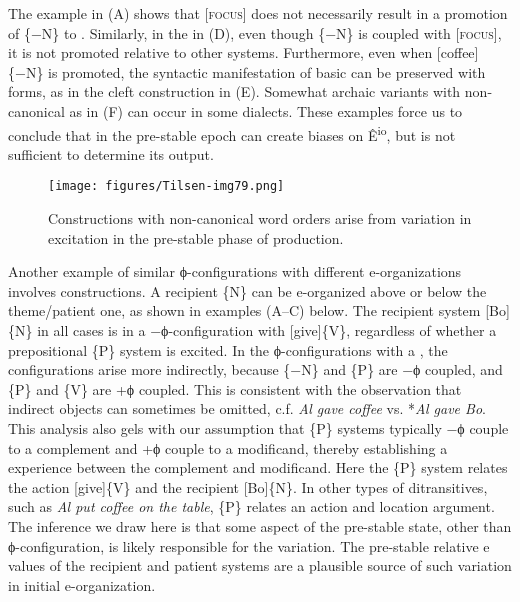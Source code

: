   The example in {}(A) shows that [\textsc{focus}] does not necessarily result in a promotion of \{−N\} to . Similarly, in the  in (D), even though \{−N\} is coupled with [\textsc{focus}], it is not promoted relative to other systems. Furthermore, even when [coffee]\{−N\} is promoted, the syntactic manifestation of basic  can be preserved with  forms, as in the cleft construction in {}(E). Somewhat archaic variants with non-canonical  as in (F) can occur in some dialects. These examples force us to conclude that  in the pre-stable epoch can create biases on Ê\textsuperscript{io}, but  is not sufficient to determine its output. 

  
\begin{figure}
\texttt{[image: figures/Tilsen-img79.png]}
\caption{Constructions with non-canonical word orders arise from variation in excitation in the pre-stable phase of production.}
\label{fig:4:29}
\end{figure}\clearpage
 

  Another example of similar ϕ-con\-fig\-u\-ra\-tions with different e-organizations involves  constructions. A recipient \{N\} can be e-organized above or below the theme/patient one, as shown in examples (A--C) below. The recipient system [Bo]\{N\} in all cases is in a −ϕ-con\-fig\-u\-ra\-tion with [give]\{V\}, regardless of whether a prepositional \{P\} system is excited. In the ϕ-con\-fig\-u\-ra\-tions with a , the configurations arise more indirectly, because \{−N\} and \{P\} are −ϕ coupled, and \{P\} and \{V\} are +ϕ coupled. This is consistent with the observation that indirect objects can sometimes be omitted, c.f. \textit{Al gave coffee} vs. *\textit{Al gave Bo}. This analysis also gels with our assumption that \{P\} systems typically −ϕ couple to a complement and +ϕ couple to a modificand, thereby establishing a  experience between the complement and modificand. Here the \{P\} system relates the action [give]\{V\} and the recipient [Bo]\{N\}. In other types of ditransitives, such as \textit{Al put coffee on the table}, \{P\} relates an action and location argument. The inference we draw here is that some aspect of the pre-stable state, other than ϕ-con\-fig\-u\-ra\-tion, is likely responsible for the variation. The pre-stable relative e values of the recipient and patient systems are a plausible source of such variation in initial e-organization.

